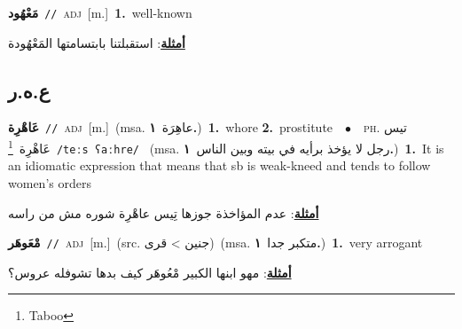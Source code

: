 \documentclass[10pt,a4paper,twoside]{article} %
\begin{document}
\begin{multicols}{2}
{\setlength\topsep{0pt}\textbf{\foreignlanguage{arabic}{مَعْهُود}}\ {\color{gray}\texttt{//}\color{black}}\ \textsc{adj}\ [m.]\ \textbf{1.}~well-known\  \begin{flushright}\color{gray}\foreignlanguage{arabic}{\textbf{\underline{\foreignlanguage{arabic}{أمثلة}}}: استقبلتنا بابتسامتها المَعْهُودة}\end{flushright}\color{black}} \vspace{2mm}

\vspace{-3mm}
\subsection*{\color{blue}\foreignlanguage{arabic}{ع.ه.ر}\color{blue}{}} 

{\setlength\topsep{0pt}\textbf{\foreignlanguage{arabic}{عَاهْرِة}}\ {\color{gray}\texttt{//}\color{black}}\ \textsc{adj}\ [m.]\ \color{gray}(msa. \foreignlanguage{arabic}{عاهِرَة}~\foreignlanguage{arabic}{\textbf{١.}})\color{black}\ \textbf{1.}~whore  \textbf{2.}~prostitute\ \ $\bullet$\ \ \textsc{ph.} \color{gray} \foreignlanguage{arabic}{تيس عَاهْرِة}\color{black}\ \footnote{Taboo}\ {\color{gray}\texttt{/{\sffamily teːs ʕaːhre}/}\color{black}}\ \color{gray} (msa. \foreignlanguage{arabic}{رجل لا يؤخذ برأيه في بيته وبين الناس}~\foreignlanguage{arabic}{\textbf{١.}})\color{black}\ \textbf{1.}~It is an idiomatic expression that means that sb is weak-kneed and tends to follow women's orders\  \begin{flushright}\color{gray}\foreignlanguage{arabic}{\textbf{\underline{\foreignlanguage{arabic}{أمثلة}}}: عدم المؤاخذة جوزها تِيس عاهْرِة شوره مش من راسه}\end{flushright}\color{black}} \vspace{2mm}

{\setlength\topsep{0pt}\textbf{\foreignlanguage{arabic}{مْعَوهَر}}\ {\color{gray}\texttt{//}\color{black}}\ \textsc{adj}\ [m.]\ (src. \color{gray}\foreignlanguage{arabic}{جنين > قرى}\color{black})\ \color{gray}(msa. \foreignlanguage{arabic}{متكبر جدا}~\foreignlanguage{arabic}{\textbf{١.}})\color{black}\ \textbf{1.}~very arrogant\  \begin{flushright}\color{gray}\foreignlanguage{arabic}{\textbf{\underline{\foreignlanguage{arabic}{أمثلة}}}: مهو ابنها الكبير مْعُوهَر كيف بدها تشوفله عروس؟}\end{flushright}\color{black}} \vspace{2mm}


\end{multicols}
\end{document}
